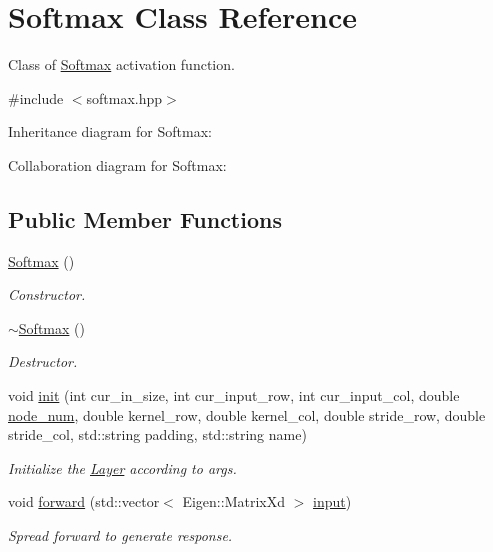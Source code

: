\hypertarget{class_softmax}{}\section{Softmax Class Reference}
\label{class_softmax}


Class of \hyperlink{class_softmax}{Softmax} activation function.  




{\ttfamily \#include $<$softmax.\+hpp$>$}



Inheritance diagram for Softmax\+:


Collaboration diagram for Softmax\+:
\subsection*{Public Member Functions}
\begin{DoxyCompactItemize}
\item 
\hyperlink{class_softmax_a884f7236004c14ed1b057b8e84f10861}{Softmax} ()
\begin{DoxyCompactList}\small\item\em Constructor. \end{DoxyCompactList}\item 
\hyperlink{class_softmax_a27af7a578766bd0762a76ad3d65ee579}{$\sim$\+Softmax} ()
\begin{DoxyCompactList}\small\item\em Destructor. \end{DoxyCompactList}\item 
void \hyperlink{class_softmax_ae1a672376cc4a904cedb36ad8b8df717}{init} (int cur\+\_\+in\+\_\+size, int cur\+\_\+input\+\_\+row, int cur\+\_\+input\+\_\+col, double \hyperlink{class_layer_a2f19878482d098654fb084b9c21b72ed}{node\+\_\+num}, double kernel\+\_\+row, double kernel\+\_\+col, double stride\+\_\+row, double stride\+\_\+col, std\+::string padding, std\+::string name)
\begin{DoxyCompactList}\small\item\em Initialize the \hyperlink{class_layer}{Layer} according to args. \end{DoxyCompactList}\item 
void \hyperlink{class_softmax_a50805d8a6bc976b1ce73c3d87e1a2d5c}{forward} (std\+::vector$<$ Eigen\+::\+Matrix\+Xd $>$ \hyperlink{class_layer_a5213366d9a5a7317c5d40d9efdcfa623}{input})
\begin{DoxyCompactList}\small\item\em Spread forward to generate response. \end{DoxyCompactList}\end{DoxyCompactItemize}

